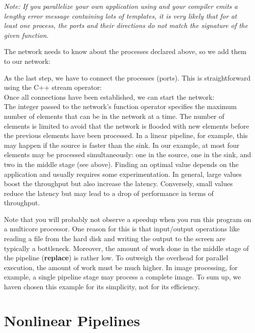 \emph{Note: If you parallelize your own application using \embb and your compiler emits a lengthy error message containing lots of templates, it is very likely that for at least one process, the ports and their directions do not match the signature of the given function.}

The network needs to know about the processes declared above, so we add them to our network:
%
\\
%

As the last step, we have to connect the processes (ports). This is straightforward using the C++ stream operator:
%
\\
%
Once all connections have been established, we can start the network:
%
\\
%
The integer passed to the network's function operator specifies the maximum number of elements that can be in the network at a time. The number of elements is limited to avoid that the network is flooded with new elements before the previous elements have been processed. In a linear pipeline, for example, this may happen if the source is faster than the sink. In our example, at most four elements may be processed simultaneously: one in the source, one in the sink, and two in the middle stage (see above). Finding an optimal value depends on the application and usually requires some experimentation. In general, large values boost the throughput but also increase the latency. Conversely, small values reduce the latency but may lead to a drop of performance in terms of throughput.

Note that you will probably not observe a speedup when you run this program on a multicore processor. One reason for this is that input$/$output operations like reading a file from the hard disk and writing the output to the screen are typically a bottleneck. Moreover, the amount of work done in the middle stage of the pipeline (\textbf{replace}) is rather low. To outweigh the overhead for parallel execution, the amount of work must be much higher. In image processing, for example, a single pipeline stage may process a complete image. To sum up, we haven chosen this example for its simplicity, not for its efficiency.

\section{Nonlinear Pipelines}

